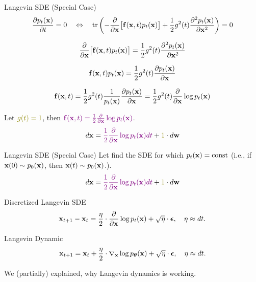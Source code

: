 \documentclass{beamer}
\renewcommand{\eqpause}{}
\begin{document}
\begin{frame}{Langevin SDE (Special Case)}
	\[
		\frac{\partial p_t(\mathbf{x})}{\partial t} = 0 \quad \Leftrightarrow \quad \text{tr}\left( - \frac{\partial}{\partial \mathbf{x}} \bigl[ \mathbf{f}(\mathbf{x}, t) p_t(\mathbf{x})\bigr] + \frac{1}{2} g^2(t) \frac{\partial^2 p_t(\mathbf{x})}{\partial \mathbf{x}^2}\right) = 0
	\]
	\vspace{-0.3cm}
	\eqpause
	\[
		\frac{\partial}{\partial \mathbf{x}} \bigl[ \mathbf{f}(\mathbf{x}, t) p_t(\mathbf{x})\bigr] = \frac{1}{2} g^2(t) \frac{\partial^2 p_t(\mathbf{x})}{\partial \mathbf{x}^2}
	\]
	\eqpause
	\[
		\mathbf{f}(\mathbf{x}, t) p_t(\mathbf{x}) = \frac{1}{2} g^2(t) \frac{\partial p_t(\mathbf{x})}{\partial \mathbf{x}}
	\]
	\eqpause
	\[
		\mathbf{f}(\mathbf{x}, t) = \frac{1}{2} g^2(t) \frac{1}{p_t(\mathbf{x})}\frac{\partial p_t(\mathbf{x})}{\partial \mathbf{x}} = \frac{1}{2} g^2(t) \frac{\partial}{\partial \mathbf{x}} \log p_t(\mathbf{x})
	\]
	\eqpause
	Let ${\color{olive}g(t)=1}$, then ${\color{violet}\mathbf{f}(\mathbf{x}, t) = \frac{1}{2} \frac{\partial}{\partial \mathbf{x}} \log p_t(\mathbf{x})}$.
	\[
		d \bx = {\color{violet}\frac{1}{2} \frac{\partial}{\partial \bx} \log p_t(\bx) d t} + {\color{olive}1} \cdot d \bw
	\]
\end{frame}
\begin{frame}{Langevin SDE (Special Case)}
	Let find the SDE for which $p_t(\mathbf{x}) = \text{const}$ (i.e., if $\mathbf{x}(0) \sim p_0(\mathbf{x})$, then $\mathbf{x}(t) \sim p_0(\mathbf{x})$.).
	\[
		d \bx = {\color{violet}\frac{1}{2} \frac{\partial}{\partial \bx} \log p_t(\bx) d t} + {\color{olive}1} \cdot d \bw
	\]
	\eqpause
	\begin{block}{Discretized Langevin SDE}
		\vspace{-0.3cm}
		\[
			\mathbf{x}_{t + 1} - \mathbf{x}_t = \frac{\eta}{2} \cdot \frac{\partial}{\partial \mathbf{x}} \log p_t(\mathbf{x}) + \sqrt{\eta} \cdot \boldsymbol{\epsilon}, \quad \eta \approx dt.
		\]
		\vspace{-0.4cm}
	\end{block}
	\begin{block}{Langevin Dynamic}
		\vspace{-0.3cm}
		\[
			\mathbf{x}_{t + 1} = \mathbf{x}_t + \frac{\eta}{2} \cdot \nabla_{\mathbf{x}} \log p_{\boldsymbol{\theta}}(\mathbf{x}) + \sqrt{\eta} \cdot \boldsymbol{\epsilon}, \quad \eta \approx dt.
		\]
		\vspace{-0.3cm}
	\end{block}
	We (partially) explained, why Langevin dynamics is working.
\end{frame}
\end{document}

